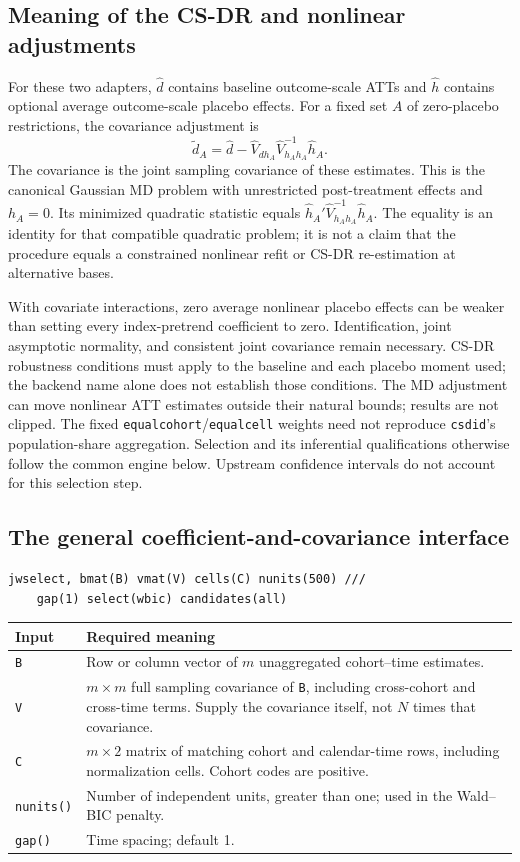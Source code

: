 \documentclass[11pt]{article}
\newcommand{\cmd}[1]{\texttt{#1}}
\begin{document}
\subsection{Meaning of the CS-DR and nonlinear adjustments}
For these two adapters, $\widehat d$ contains baseline outcome-scale ATTs
and $\widehat h$ contains optional average outcome-scale placebo effects.
For a fixed set $A$ of zero-placebo restrictions, the covariance adjustment is
\[
 \widetilde d_A=\widehat d-
 \widehat V_{dh_A}\widehat V_{h_Ah_A}^{-1}\widehat h_A.
\]
The covariance is the joint sampling covariance of these estimates.
This is the canonical Gaussian MD problem with unrestricted post-treatment
effects and $h_A=0$. Its minimized quadratic statistic equals
$\widehat h_A'\widehat V_{h_Ah_A}^{-1}\widehat h_A$. The equality is an
identity for that compatible quadratic problem; it is not a claim that the
procedure equals a constrained nonlinear refit or CS-DR re-estimation at
alternative bases.

With covariate interactions, zero average nonlinear placebo effects can be
weaker than setting every index-pretrend coefficient to zero. Identification,
joint asymptotic normality, and consistent joint covariance remain necessary.
CS-DR robustness conditions must apply to the baseline and each placebo moment
used; the backend name alone does not establish those conditions. The MD
adjustment can move nonlinear ATT estimates outside their natural bounds;
results are not clipped. The fixed \cmd{equalcohort}/\cmd{equalcell} weights
need not reproduce \cmd{csdid}'s population-share aggregation.
Selection and its inferential qualifications otherwise follow the common
engine below. Upstream confidence intervals do not account for this
selection step.

\subsection{The general coefficient-and-covariance interface}
\begin{lstlisting}
jwselect, bmat(B) vmat(V) cells(C) nunits(500) ///
    gap(1) select(wbic) candidates(all)
\end{lstlisting}

\begin{tabularx}{\linewidth}{@{}lX@{}}
\toprule
Input & Required meaning \\
\midrule
\cmd{B} & Row or column vector of $m$ unaggregated cohort--time estimates. \\
\cmd{V} & $m\times m$ full sampling covariance of \cmd{B}, including cross-cohort and cross-time terms. Supply the covariance itself, not $N$ times that covariance. \\
\cmd{C} & $m\times2$ matrix of matching cohort and calendar-time rows, including normalization cells. Cohort codes are positive. \\
\cmd{nunits()} & Number of independent units, greater than one; used in the Wald--BIC penalty. \\
\cmd{gap()} & Time spacing; default 1. \\
\bottomrule
\end{tabularx}
\end{document}
